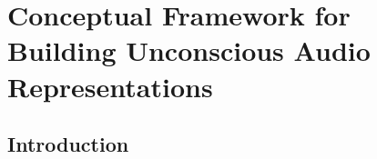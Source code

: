 \documentclass[a4paper,10pt,final]{ThesisStyle}
\begin{document}


\chapter{Conceptual Framework for Building Unconscious Audio Representations}
\label{ch:conceptual-audio}
\minitoc

\section{Introduction}







\end{document}
